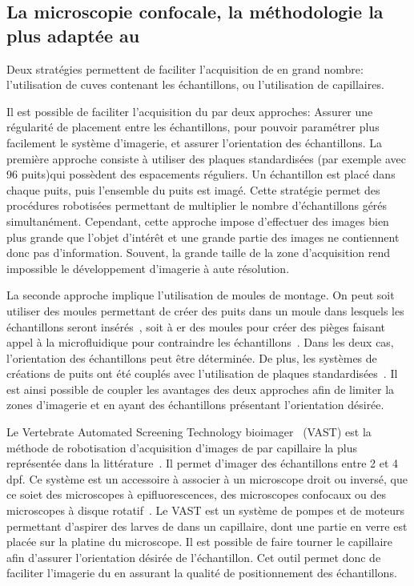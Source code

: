 \documentclass[\main/main.tex]{subfiles}
\begin{document}
    \subsection{La microscopie confocale, la méthodologie la plus adaptée au \hcs{}}
    
Deux stratégies  permettent de faciliter l'acquisition de \pz{} en grand nombre: l'utilisation de cuves contenant les échantillons, ou l'utilisation de capillaires.
   
%
Il est possible de faciliter l'acquisition du \pz{} par deux approches:
Assurer une régularité de placement entre les échantillons,
pour pouvoir paramétrer plus facilement le système d'imagerie, et assurer l'orientation des échantillons.
%
La première approche consiste à utiliser des plaques standardisées (par exemple avec 96 puits)qui possèdent des espacements réguliers. Un échantillon est placé dans chaque puits, puis l'ensemble du puits est imagé. Cette stratégie permet des procédures robotisées permettant de multiplier le nombre d'échantillons gérés simultanément.
%
Cependant, cette approche impose d'effectuer des images bien plus grande que l'objet d'intérêt et une grande partie des images ne contiennent donc pas d'information. Souvent, la grande taille de la zone d'acquisition rend impossible le développement d'imagerie à aute résolution.

%
\label{sec:moule_montage}
La seconde approche implique l'utilisation de moules de montage.
%
On peut soit utiliser des moules permettant de créer des puits dans un moule dans lesquels les échantillons seront insérés~\cite{donoughe_2018,kleinhans_2019}, soit à er des moules pour créer des pièges faisant appel à la microfluidique pour contraindre les échantillons~\cite{khalili_2019}. Dans les deux cas, l'orientation des échantillons peut être déterminée.
%
De plus, les systèmes de créations de puits ont été couplés avec l'utilisation de plaques standardisées~\cite{wittbrodt_2014}.
%
Il est ainsi possible de coupler les avantages des deux approches afin de limiter la zones d'imagerie et en ayant des échantillons présentant l'orientation désirée.

\label{sec:vast}
Le Vertebrate Automated Screening Technology bioimager~\cite{pardomartin_2010} (VAST) est la méthode de robotisation d'acquisition d'images de \pz{} par capillaire la plus représentée dans la littérature~\cite{jarque_2018,teixid_2019}. Il permet d'imager des échantillons entre 2 et 4 dpf.
%
Ce système est un accessoire à associer à un microscope droit ou inversé, que ce soiet des microscopes à epifluorescences, des microscopes confocaux ou des microscopes à disque rotatif~\cite{early_2018, guo_2017}.
%
Le VAST est un système de pompes et de moteurs permettant d'aspirer des larves de \pz{} dans un capillaire, dont une partie en verre est placée sur la platine du microscope. 
%
Il est possible de faire tourner le capillaire afin d'assurer l'orientation désirée de l'échantillon.
%
Cet outil permet donc de faciliter l'imagerie du \pz{} en assurant la qualité de positionnement des échantillons.
\end{document}
